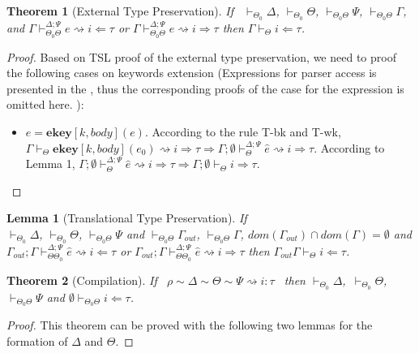 \documentclass{sig-alternate}
\newcommand{\myvdash}{\vdash_{\Theta}^{\Delta;\Psi}}
\newtheorem{theorem}{Theorem}
\newtheorem{lemma}{Lemma}
\begin{document}
\begin{theorem}[External Type Preservation]
If ~$\vdash_{\Theta_0}\Delta$, $\vdash_{\Theta_0}\Theta$, $\vdash_{\Theta_0\Theta}\Psi$, $\vdash_{\Theta_0\Theta}\Gamma$, and $\Gamma\vdash_{\Theta_0\Theta}^{\Delta;\Psi} e\rightsquigarrow i\Leftarrow\tau$ or $\Gamma\vdash_{\Theta_0\Theta}^{\Delta;\Psi} e\rightsquigarrow i\Rightarrow\tau$ then $\Gamma\vdash_{\Theta} i\Leftarrow\tau$.
\end{theorem}
\begin{proof}
Based on TSL proof of the external type preservation, we need to proof the following cases on keywords extension (Expressions for parser access is presented in the , thus the corresponding proofs of the case for the expression is omitted here. ):
\begin{itemize}
\item $e=\mathbf{ekey}[k,body](e)$. According to the rule T-bk and T-wk, $\Gamma\vdash_{\Theta}\mathbf{ekey}[k,body](e_0) \rightsquigarrow i \Rightarrow \tau \Longrightarrow \Gamma;\emptyset\myvdash \hat{e} \rightsquigarrow i \Rightarrow \tau$. According to Lemma 1, $\Gamma;\emptyset\myvdash \hat{e} \rightsquigarrow i \Rightarrow \tau \Longrightarrow \Gamma;\emptyset\vdash_{\Theta} i\Rightarrow\tau$.
\end{itemize}
\end{proof}

\begin{lemma}[Translational Type Preservation]
If \\$\vdash_{\Theta_0}\Delta$, $\vdash_{\Theta_0}\Theta$, $\vdash_{\Theta_0\Theta}\Psi$ and $\vdash_{\Theta_0\Theta}\Gamma_{out}$, $\vdash_{\Theta_0\Theta}\Gamma$, $dom(\Gamma_{out})\cap dom(\Gamma)=\emptyset$ and $\Gamma_{out};\Gamma\vdash_{\Theta\Theta_0}^{\Delta;\Psi}\hat{e}\rightsquigarrow i\Leftarrow\tau$ or $\Gamma_{out};\Gamma\vdash_{\Theta\Theta_0}^{\Delta;\Psi}\hat{e}\rightsquigarrow i\Rightarrow \tau$ then $\Gamma_{out}\Gamma\vdash_{\Theta}i\Leftarrow \tau$.
\end{lemma}

\begin{theorem}[Compilation]
If ~$\rho\sim\Delta\sim\Theta\sim\Psi\rightsquigarrow i:\tau$~ then $\vdash_{\Theta_0}\Delta$,\ $\vdash_{\Theta_0}\Theta$, $\vdash_{\Theta_0\Theta}\Psi$ and $\emptyset\vdash_{\Theta_0\Theta} i\Leftarrow\tau$.
\end{theorem}
\begin{proof}
This theorem can be proved with the following two lemmas for the formation of $\Delta$ and $\Theta$.
\end{proof}
\end{document}
